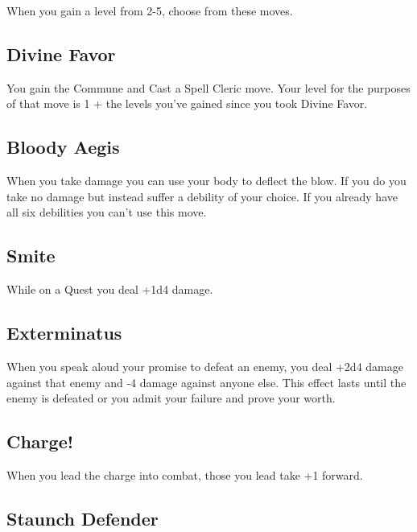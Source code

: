 \startInstructionsAfterHeader
When you gain a level from 2-5, choose from these moves.
\stopInstructionsAfterHeader
 
\subsection{Divine Favor}    
 

You gain the Commune and Cast a Spell Cleric move. Your level for the purposes of that move is 1 + the levels you've gained since you took Divine Favor.

 
\subsection{Bloody Aegis}    
 

When you take damage you can use your body to deflect the blow. If you do you take no damage but instead suffer a debility of your choice. If you already have all six debilities you can't use this move.

 
\subsection{Smite}   
 

While on a Quest you deal +1d4 damage.

 
\subsection{Exterminatus}   
 

When you speak aloud your promise to defeat an enemy, you deal +2d4 damage against that enemy and -4 damage against anyone else. This effect lasts until the enemy is defeated or you admit your failure and prove your worth.

 
\subsection{Charge!}   
 

When you lead the charge into combat, those you lead take +1 forward.

 
\subsection{Staunch Defender}    
 

